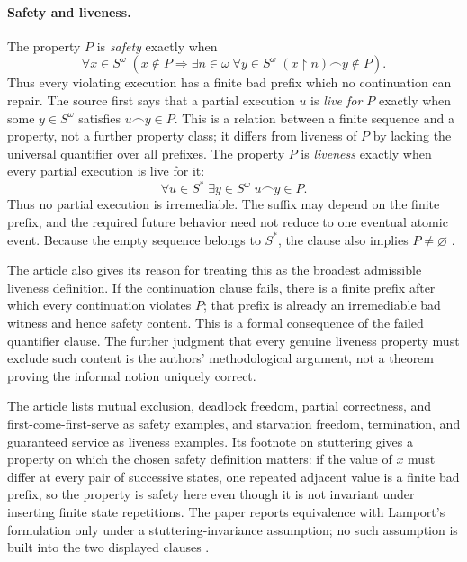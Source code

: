 \paragraph{Safety and liveness.}
The property \(P\) is \emph{safety} exactly when
\[
 \forall x\in S^\omega\;
 \left(
  x\notin P
  \Longrightarrow
  \exists n\in\omega\;
  \forall y\in S^\omega\;
  (x{\upharpoonright}n)\mathbin{\smallfrown}y\notin P
 \right).
\]
Thus every violating execution has a finite bad prefix which no continuation
can repair.  The source first says that a partial execution \(u\) is
\emph{live for \(P\)} exactly when some \(y\in S^\omega\) satisfies
\(u\mathbin{\smallfrown}y\in P\).  This is a relation between a finite sequence
and a property, not a further property class; it differs from liveness of
\(P\) by lacking the universal quantifier over all prefixes.  The property
\(P\) is \emph{liveness} exactly when every partial execution is live for it:
\[
 \forall u\in S^*\;
 \exists y\in S^\omega\;
 u\mathbin{\smallfrown}y\in P.
\]
Thus no partial execution is irremediable.  The suffix may depend on the finite
prefix, and the required future behavior need not reduce to one eventual
atomic event.  Because the empty sequence belongs to \(S^*\), the clause also
implies \(P\neq\varnothing\)
\cite[pp.~182--183]{AlpernSchneider1985}.

The article also gives its reason for treating this as the broadest admissible
liveness definition.  If the continuation clause fails, there is a finite
prefix after which every continuation violates \(P\); that prefix is already
an irremediable bad witness and hence safety content.  This is a formal
consequence of the failed quantifier clause.  The further judgment that every
genuine liveness property must exclude such content is the authors'
methodological argument, not a theorem proving the informal notion uniquely
correct.

The article lists mutual exclusion, deadlock freedom, partial correctness, and
first-come-first-serve as safety examples, and starvation freedom,
termination, and guaranteed service as liveness examples.  Its footnote on
stuttering gives a property on which the chosen safety definition matters: if
the value of \(x\) must differ at every pair of successive states, one repeated
adjacent value is a finite bad prefix, so the property is safety here even
though it is not invariant under inserting finite state repetitions.  The
paper reports equivalence with Lamport's formulation only under a
stuttering-invariance assumption; no such assumption is built into the two
displayed clauses \cite[p.~182, n.~1]{AlpernSchneider1985}.

